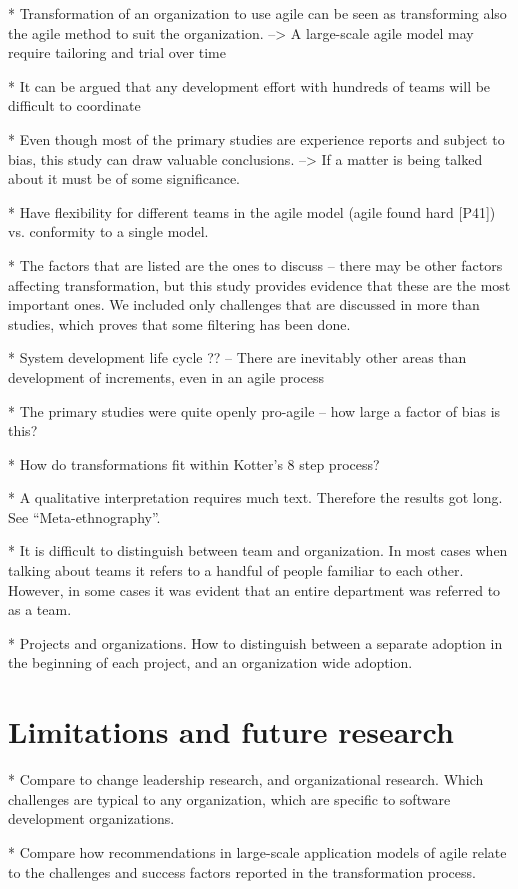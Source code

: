 * Transformation of an organization to use agile can be seen as transforming
  also the agile method to suit the organization.
  --> A large-scale agile model may require tailoring and trial over time

* It can be argued that any development effort with hundreds of teams will be
  difficult to coordinate

* Even though most of the primary studies are experience reports and subject to
  bias, this study can draw valuable conclusions. --> If a matter is being
  talked about it must be of some significance.

* Have flexibility for different teams in the agile model (agile found
  hard [P41]) vs. conformity to a single model. 

* The factors that are listed are the ones to discuss -- there may be other
  factors affecting transformation, but this study provides evidence that these
  are the most important ones. We included only challenges that are discussed in
  more than studies, which proves that some filtering has been done.

* System development life cycle ?? -- There are inevitably other areas than
  development of increments, even in an agile process

* The primary studies were quite openly pro-agile -- how large a factor of bias
  is this?

* How do transformations fit within Kotter's 8 step process?

* A qualitative interpretation requires much text. Therefore the results got
  long. See ``Meta-ethnography''.

* It is difficult to distinguish between team and organization. In most cases
  when talking about teams it refers to a handful of people familiar to each
  other. However, in some cases it was evident that an entire department was
  referred to as a team.

* Projects and organizations. How to distinguish between a separate adoption in
  the beginning of each project, and an organization wide adoption.


\section{Limitations and future research}
\label{sec:conclusion}

* Compare to change leadership research, and organizational research. Which
  challenges are typical to any organization, which are specific to software
  development organizations.

* Compare how recommendations in large-scale application models of agile relate
  to the challenges and success factors reported in the transformation process. 






